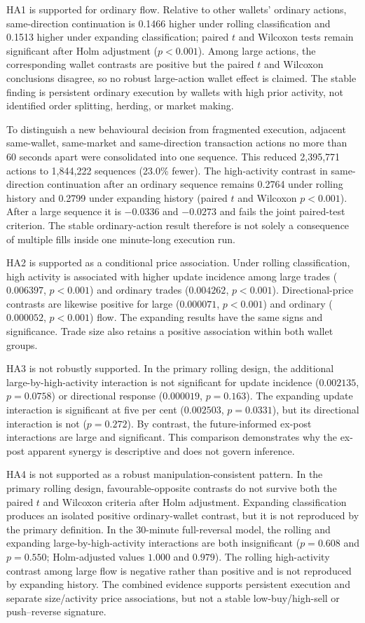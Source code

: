 HA1 is supported for ordinary flow. Relative to other wallets' ordinary
actions, same-direction continuation is 0.1466 higher under rolling
classification and 0.1513 higher under expanding classification; paired $t$
and Wilcoxon tests remain significant after Holm adjustment ($p<0.001$). Among
large actions, the corresponding wallet contrasts are positive but the paired
$t$ and Wilcoxon conclusions disagree, so no robust large-action wallet effect
is claimed. The stable finding is persistent ordinary execution by wallets
with high prior activity, not identified order splitting, herding, or market
making.

To distinguish a new behavioural decision from fragmented execution, adjacent
same-wallet, same-market and same-direction transaction actions no more than 60
seconds apart were consolidated into one sequence. This reduced 2,395,771
actions to 1,844,222 sequences (23.0\% fewer). The high-activity contrast in
same-direction continuation after an ordinary sequence remains 0.2764 under
rolling history and 0.2799 under expanding history (paired $t$ and Wilcoxon
$p<0.001$). After a large sequence it is $-0.0336$ and $-0.0273$ and fails the
joint paired-test criterion. The stable ordinary-action result therefore is not
solely a consequence of multiple fills inside one minute-long execution run.

HA2 is supported as a conditional price association. Under rolling
classification, high activity is associated with higher update incidence among
large trades ($0.006397$, $p<0.001$) and ordinary trades ($0.004262$,
$p<0.001$). Directional-price contrasts are likewise positive for large
($0.000071$, $p<0.001$) and ordinary ($0.000052$, $p<0.001$) flow. The expanding
results have the same signs and significance. Trade size also retains a
positive association within both wallet groups.

HA3 is not robustly supported. In the primary rolling design, the additional
large-by-high-activity interaction is not significant for update incidence
($0.002135$, $p=0.0758$) or directional response ($0.000019$, $p=0.163$). The
expanding update interaction is significant at five per cent ($0.002503$,
$p=0.0331$), but its directional interaction is not ($p=0.272$). By contrast,
the future-informed ex-post interactions are large and significant. This
comparison demonstrates why the ex-post apparent synergy is descriptive and
does not govern inference.

HA4 is not supported as a robust manipulation-consistent pattern. In the
primary rolling design, favourable-opposite contrasts do not survive both the
paired $t$ and Wilcoxon criteria after Holm adjustment. Expanding classification
produces an isolated positive ordinary-wallet contrast, but it is not reproduced
by the primary definition. In the 30-minute full-reversal model, the rolling
and expanding large-by-high-activity interactions are both insignificant
($p=0.608$ and $p=0.550$; Holm-adjusted values $1.000$ and $0.979$). The rolling
high-activity contrast among large flow is negative rather than positive and
is not reproduced by expanding history. The combined evidence supports
persistent execution and separate size/activity price associations, but not a
stable low-buy/high-sell or push--reverse signature.

